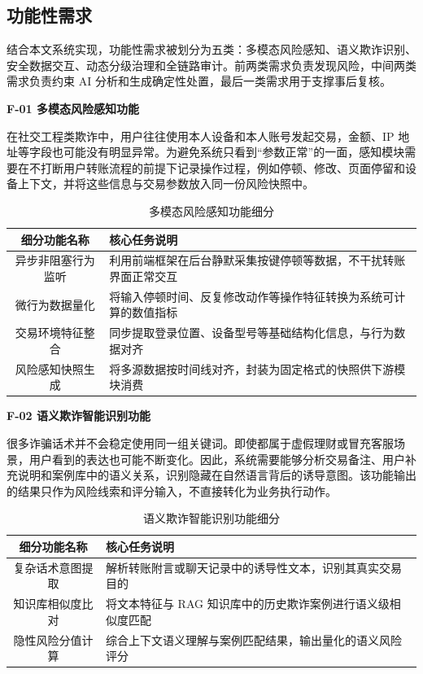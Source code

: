 \documentclass{xduugthesis}
\begin{document}
\subsection{功能性需求}

结合本文系统实现，功能性需求被划分为五类：多模态风险感知、语义欺诈识别、安全数据交互、动态分级治理和全链路审计。前两类需求负责发现风险，中间两类需求负责约束 AI 分析和生成确定性处置，最后一类需求用于支撑事后复核。

\textbf{F-01 多模态风险感知功能}

在社交工程类欺诈中，用户往往使用本人设备和本人账号发起交易，金额、IP 地址等字段也可能没有明显异常。为避免系统只看到“参数正常”的一面，感知模块需要在不打断用户转账流程的前提下记录操作过程，例如停顿、修改、页面停留和设备上下文，并将这些信息与交易参数放入同一份风险快照中。

\begin{table}[H]
    \centering
    \caption{多模态风险感知功能细分}
    \label{tab:f01-sub}
    \begin{tabularx}{\linewidth}{|c|Y|}
        \hline
        细分功能名称 & 核心任务说明 \\
        \hline
        异步非阻塞行为监听 & 利用前端框架在后台静默采集按键停顿等数据，不干扰转账界面正常交互 \\
        \hline
        微行为数据量化 & 将输入停顿时间、反复修改动作等操作特征转换为系统可计算的数值指标 \\
        \hline
        交易环境特征整合 & 同步提取登录位置、设备型号等基础结构化信息，与行为数据对齐 \\
        \hline
        风险感知快照生成 & 将多源数据按时间线对齐，封装为固定格式的快照供下游模块消费 \\
        \hline
    \end{tabularx}
\end{table}

\textbf{F-02 语义欺诈智能识别功能}

很多诈骗话术并不会稳定使用同一组关键词。即使都属于虚假理财或冒充客服场景，用户看到的表达也可能不断变化。因此，系统需要能够分析交易备注、用户补充说明和案例库中的语义关系，识别隐藏在自然语言背后的诱导意图。该功能输出的结果只作为风险线索和评分输入，不直接转化为业务执行动作。

\begin{table}[H]
    \centering
    \caption{语义欺诈智能识别功能细分}
    \label{tab:f02-sub}
    \begin{tabularx}{\linewidth}{|c|Y|}
        \hline
        细分功能名称 & 核心任务说明 \\
        \hline
        复杂话术意图提取 & 解析转账附言或聊天记录中的诱导性文本，识别其真实交易目的 \\
        \hline
        知识库相似度比对 & 将文本特征与 RAG 知识库中的历史欺诈案例进行语义级相似度匹配 \\
        \hline
        隐性风险分值计算 & 综合上下文语义理解与案例匹配结果，输出量化的语义风险评分 \\
        \hline
    \end{tabularx}
\end{table}
\end{document}

